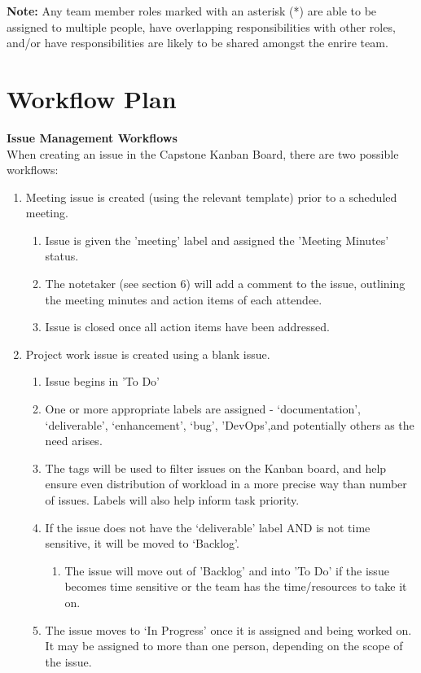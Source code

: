 \documentclass{article}
\begin{document}
\textbf{Note:} Any team member roles marked with an asterisk (*) are able to be assigned to multiple people, 
have overlapping responsibilities with other roles, and/or have responsibilities are likely to be shared amongst the enrire team.

\section{Workflow Plan}

\textbf{Issue Management Workflows}\\
When creating an issue in the Capstone Kanban Board, there are two possible workflows:
\begin{enumerate}
  \item Meeting issue is created (using the relevant template) prior to a scheduled meeting.  
  \begin{enumerate}
    \item Issue is given the 'meeting' label and assigned the 'Meeting Minutes' status.
    \item The notetaker (see section 6) will add a comment to the issue, outlining the meeting minutes and action items of each attendee.
    \item Issue is closed once all action items have been addressed.
  \end{enumerate}
  \item Project work issue is created using a blank issue.
  \begin{enumerate}
    \item Issue begins in 'To Do'
    \item One or more appropriate labels are assigned - ‘documentation’, ‘deliverable’, ‘enhancement’, ‘bug’, 'DevOps',and potentially others as the need arises.
    \item The tags will be used to filter issues on the Kanban board, and help ensure even distribution of workload in a more precise way than number of issues. Labels will also help inform task priority.
    \item If the issue does not have the ‘deliverable’ label AND is not time sensitive, it will be moved to ‘Backlog’.
    \begin{enumerate}
      \item The issue will move out of 'Backlog' and into 'To Do' if the issue becomes time sensitive or the team has the time/resources to take it on.
    \end{enumerate}
    \item The issue moves to ‘In Progress’ once it is assigned and being worked on. It may be assigned to more than one person, depending on the scope of the issue.

\end{enumerate}
\end{enumerate}
\end{document}
